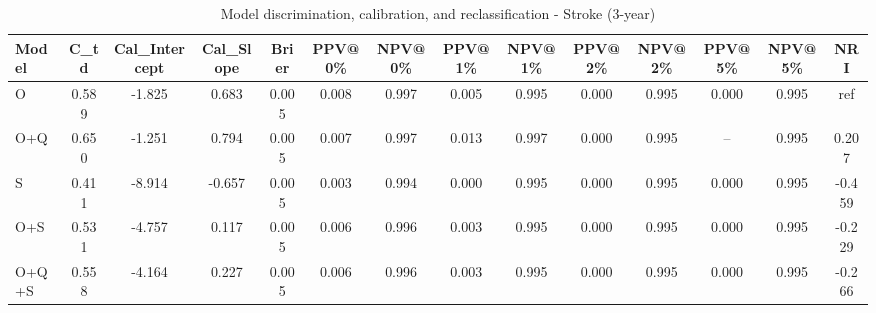 \begin{table}[htbp]
\centering
\small
\caption{Model discrimination, calibration, and reclassification - Stroke (3-year)}
\label{tab:perf_stroke_3y}
\begin{tabular}{lccccccccccccc}
\toprule
Model & C\_td & Cal\_Intercept & Cal\_Slope & Brier & PPV@0\% & NPV@0\% & PPV@1\% & NPV@1\% & PPV@2\% & NPV@2\% & PPV@5\% & NPV@5\% & NRI \\
\midrule
O & 0.589 & -1.825 & 0.683 & 0.005 & 0.008 & 0.997 & 0.005 & 0.995 & 0.000 & 0.995 & 0.000 & 0.995 & ref \\
O+Q & 0.650 & -1.251 & 0.794 & 0.005 & 0.007 & 0.997 & 0.013 & 0.997 & 0.000 & 0.995 & -- & 0.995 & 0.207 \\
S & 0.411 & -8.914 & -0.657 & 0.005 & 0.003 & 0.994 & 0.000 & 0.995 & 0.000 & 0.995 & 0.000 & 0.995 & -0.459 \\
O+S & 0.531 & -4.757 & 0.117 & 0.005 & 0.006 & 0.996 & 0.003 & 0.995 & 0.000 & 0.995 & 0.000 & 0.995 & -0.229 \\
O+Q+S & 0.558 & -4.164 & 0.227 & 0.005 & 0.006 & 0.996 & 0.003 & 0.995 & 0.000 & 0.995 & 0.000 & 0.995 & -0.266 \\
\bottomrule
\end{tabular}
\end{table}